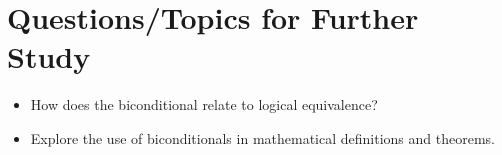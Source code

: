 \documentclass[12pt,a4paper]{article}
\begin{document}
\section{Questions/Topics for Further Study}
\begin{itemize}
  \item How does the biconditional relate to logical equivalence?
  \item Explore the use of biconditionals in mathematical definitions and theorems.
\end{itemize}
\end{document}
